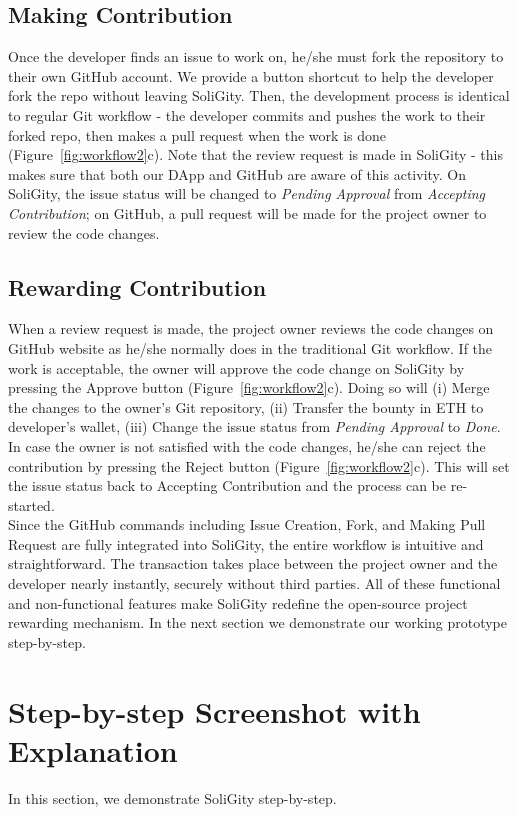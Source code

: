 \documentclass[12pt]{article}
\renewcommand{\_}{\kern-1.5pt\textunderscore\kern-1.5pt}
\begin{document}
\subsection{Making Contribution}

Once the developer finds an issue to work on, he/she must fork the repository to their own GitHub account. We provide a button shortcut to help the developer fork the repo without leaving SoliGity. Then, the development process is identical to regular Git workflow - the developer commits and pushes the work to their forked repo, then makes a pull request when the work is done (Figure~\ref{fig:workflow2}c). Note that the review request is made in SoliGity - this makes sure that both our DApp and GitHub are aware of this activity. On SoliGity, the issue status will be changed to \textit{Pending Approval} from \textit{Accepting Contribution}; on GitHub, a pull request will be made for the project owner to review the code changes.

\subsection{Rewarding Contribution}
When a review request is made, the project owner reviews the code changes on GitHub website as he/she normally does in the traditional Git workflow. If the work is acceptable, the owner will approve the code change on SoliGity by pressing the Approve button (Figure~\ref{fig:workflow2}c). Doing so will (i) Merge the changes to the owner’s Git repository,
(ii) Transfer the bounty in ETH to developer’s wallet,
(iii) Change the issue status from \textit{Pending Approval} to \textit{Done}. In case the owner is not satisfied with the code changes, he/she can reject the contribution by pressing the Reject button (Figure~\ref{fig:workflow2}c). This will set the issue status back to Accepting Contribution and the process can be re-started.  \\


\noindent Since the GitHub commands including Issue Creation, Fork, and Making Pull Request are fully integrated into SoliGity, the entire workflow is intuitive and straightforward. The transaction takes place between the project owner and the developer nearly instantly, securely without third parties. All of these functional and non-functional features make SoliGity redefine the open-source project rewarding mechanism. In the next section we demonstrate our working prototype step-by-step.

\section{Step-by-step Screenshot with Explanation}
In this section, we demonstrate SoliGity step-by-step.
\end{document}
